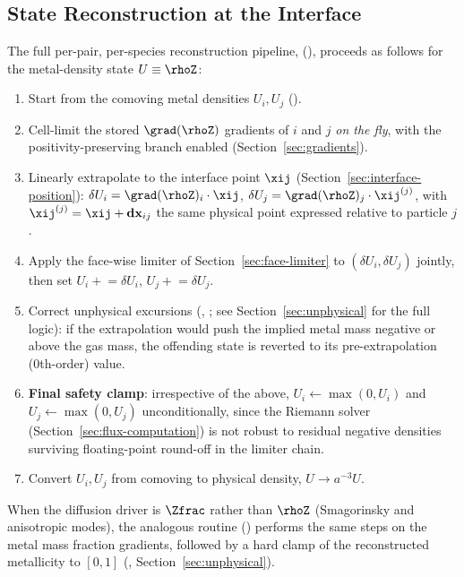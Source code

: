 \subsection{State Reconstruction at the Interface}
\label{sec:state-reconstruction}
The full per-pair, per-species reconstruction pipeline,
(), proceeds as follows for
the metal-density state $U \equiv \rhoZ$:
\begin{enumerate}
  \item Start from the comoving metal densities $U_i, U_j$
        ().
  \item Cell-limit the stored $\grad(\rhoZ)$ gradients of $i$ and $j$
        \emph{on the fly}, with the positivity-preserving branch enabled
        (Section~\ref{sec:gradients}).
  \item Linearly extrapolate to the interface point $\xij$
        (Section~\ref{sec:interface-position}):
        $\delta U_i = \grad(\rhoZ)_i \cdot \xij$,
        $\delta U_j = \grad(\rhoZ)_j \cdot \xij^{(j)}$, with
        $\xij^{(j)} = \xij + \mathbf{dx}_{ij}$ the same physical point
        expressed relative to particle $j$.
  \item Apply the face-wise limiter of Section~\ref{sec:face-limiter} to
        $(\delta U_i,\delta U_j)$ jointly, then set
        $U_i \mathrel{+}= \delta U_i$, $U_j \mathrel{+}= \delta U_j$.
  \item Correct unphysical excursions
        (,
        ; see
        Section~\ref{sec:unphysical} for the full logic): if the
        extrapolation would push the implied metal mass negative or
        above the gas mass, the offending state is reverted to its
        pre-extrapolation (0th-order) value.
  \item \textbf{Final safety clamp}: irrespective of the above,
        $U_i \gets \max(0, U_i)$ and $U_j \gets \max(0, U_j)$
        unconditionally, since the Riemann solver
        (Section~\ref{sec:flux-computation}) is not robust to residual
        negative densities surviving floating-point round-off in the
        limiter chain.
  \item Convert $U_i, U_j$ from comoving to physical density,
        $U \to a^{-3} U$.
\end{enumerate}
When the diffusion driver is $\Zfrac$ rather than $\rhoZ$ (Smagorinsky
and anisotropic modes), the analogous routine
() performs the same steps on the
metal mass fraction gradients, followed by a hard clamp of the
reconstructed metallicity to $[0,1]$
(,
Section~\ref{sec:unphysical}).

